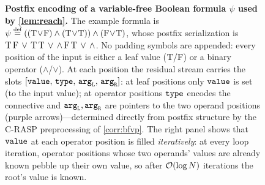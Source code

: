 \documentclass{article}
\begin{document}
\begin{figure}[ht]
%
    \caption{
    \textbf{Postfix encoding of a variable-free Boolean formula $\psi$ used by \cref{lem:reach}.}
    The example formula is $\psi \defeq ((\TRUE\!\lor\!\FALSE)\land(\TRUE\!\lor\!\TRUE))\land(\FALSE\!\lor\!\TRUE)$, whose postfix serialization is ${\mathbin{\mathrm{T}}}\,{\mathbin{\mathrm{F}}}\,\lor\,{\mathbin{\mathrm{T}}}\,{\mathbin{\mathrm{T}}}\,\lor\,\land\,{\mathbin{\mathrm{F}}}\,{\mathbin{\mathrm{T}}}\,\lor\,\land$. No padding symbols are appended: every position of the input is either a \textcolor{ETHGreen}{leaf value} (${\mathbin{\mathrm{T}}}/{\mathbin{\mathrm{F}}}$) or a \textcolor{ETHBlue}{binary operator} ($\land$/$\lor$). At each position the residual stream carries the slots $[{\mathtt{value}},\,{\mathtt{type}},\,{\mathtt{arg}_\mathtt{L}},\,{\mathtt{arg}_\mathtt{R}}]$: at leaf positions only ${\mathtt{value}}$ is set (to the input value); at operator positions ${\mathtt{type}}$ encodes the connective and ${\mathtt{arg}_\mathtt{L}},{\mathtt{arg}_\mathtt{R}}$ are pointers to the two operand positions (\textcolor{ETHPurple}{purple} arrows)---determined directly from postfix structure by the \textsc{C-RASP} preprocessing of \cref{corr:bfvp}. The right panel shows that ${\mathtt{value}}$ at each operator position is filled \emph{iteratively}: at every loop iteration, operator positions whose two operands' values are already known pebble up their own value, so after ${{ \mathcal{O}}}(\log {{ N}})$ iterations the \textcolor{ETHBronze}{root}'s value is known.
    }
    \label{fig:lemreach}
\end{figure}
\end{document}
